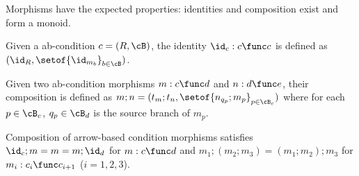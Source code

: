 \medskip\noindent Morphisms have the expected properties: identities and composition exist and form a monoid.
%
\begin{definition}
  Given a ab-condition $c=(R,\cB)$, the identity $\id_c:c\func c$ is defined as $(\id_R,\setof{\id_{m_b}}_{b\in \cB})$.
\end{definition}

\begin{definition}
Given two ab-condition morphisms $m:c\func d$ and $n:d\func e$, their composition is defined as $m;n=(t_m;t_n,\setof{n_{q_p};m_p}_{p\in \cB_c})$ where for each $p\in \cB_c$, $q_p\in \cB_d$ is the source branch of $m_p$.
\end{definition}

\begin{proposition}
  Composition of arrow-based condition morphisms satisfies $\id_c;m=m=m;\id_d$ for $m:c\func d$ and $m_1;(m_2;m_3)=(m_1;m_2);m_3$ for $m_i:c_i\func c_{i+1}$ ($i=1,2,3$).
\end{proposition}

